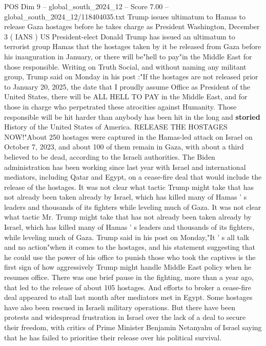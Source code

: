 \begin{textsample}{POS Dim 9 – global\_south\_2024\_12 – Score 7.00 – global\_south\_2024\_12/118404035.txt}  \label{ex:f9_pos_321}
Trump issues ultimatum to Hamas to release Gaza hostages before he takes charge as President Washington, December 3 ( IANS ) US President-elect Donald Trump has issued an ultimatum to terrorist group Hamas that the hostages taken by it be released from Gaza before his inauguration in January, or there will be"hell to pay"in the Middle East for those responsible.
Writing on Truth Social, and without naming any militant group, Trump said on Monday in his post :"If the hostages are not released prior to January 20, 2025, the date that I proudly assume Office as President of the United States, there will be ALL HELL TO PAY in the Middle East, and for those in charge who perpetrated these atrocities against Humanity.
Those responsible will be hit harder than anybody has been hit in the long and \textbf{storied} History of the United States of America.
RELEASE THE HOSTAGES NOW!"About 250 hostages were captured in the Hamas-led attack on Israel on October 7, 2023, and about 100 of them remain in Gaza, with about a third believed to be dead, according to the Israeli authorities.
The Biden administration has been working since last year with Israel and international mediators, including Qatar and Egypt, on a cease-fire deal that would include the release of the hostages.
It was not clear what tactic Trump might take that has not already been taken already by Israel, which has killed many of Hamas ' s leaders and thousands of its fighters while leveling much of Gaza.
It was not clear what tactic Mr.
Trump might take that has not already been taken already by Israel, which has killed many of Hamas ' s leaders and thousands of its fighters, while leveling much of Gaza.
Trump said in his post on Monday,"It ' s all talk and no action"when it comes to the hostages, and his statement suggesting that he could use the power of his office to punish those who took the captives is the first sign of how aggressively Trump might handle Middle East policy when he resumes office.
There was one brief pause in the fighting, more than a year ago, that led to the release of about 105 hostages.
And efforts to broker a cease-fire deal appeared to stall last month after mediators met in Egypt.
Some hostages have also been rescued in Israeli military operations.
But there have been protests and widespread frustration in Israel over the lack of a deal to secure their freedom, with critics of Prime Minister Benjamin Netanyahu of Israel saying that he has failed to prioritise their release over his political survival.

\end{textsample}
